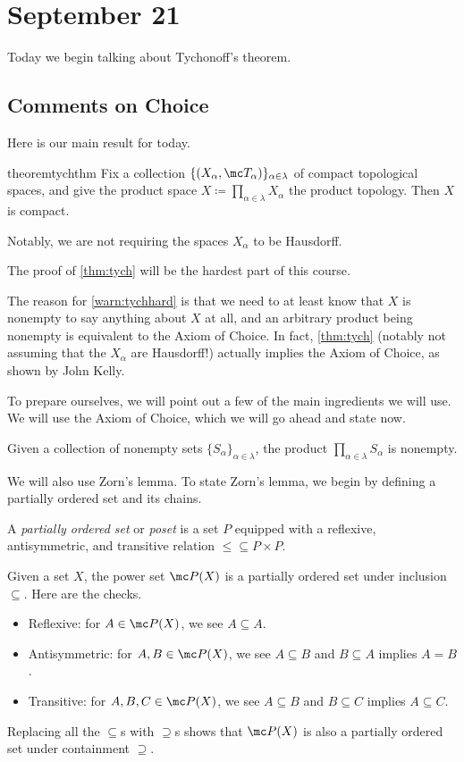 \documentclass[../notes.tex]{subfiles}
\begin{document}
\section{September 21}

Today we begin talking about Tychonoff's theorem.

\subsection{Comments on Choice}
Here is our main result for today.
\begin{restatable}[Tychonoff]{theorem}{tychthm} \label{thm:tych}
	Fix a collection $\{(X_\alpha,\mc T_\alpha)\}_{\alpha\in\lambda}$ of compact topological spaces, and give the product space $X\coloneqq\prod_{\alpha\in\lambda}X_\alpha$ the product topology. Then $X$ is compact.
\end{restatable}
\noindent Notably, we are not requiring the spaces $X_\alpha$ to be Hausdorff.
\begin{warn} \label{warn:tychhard}
	The proof of \autoref{thm:tych} will be the hardest part of this course.
\end{warn}
\begin{remark}
	The reason for \autoref{warn:tychhard} is that we need to at least know that $X$ is nonempty to say anything about $X$ at all, and an arbitrary product being nonempty is equivalent to the Axiom of Choice. In fact, \autoref{thm:tych} (notably not assuming that the $X_\alpha$ are Hausdorff!) actually implies the Axiom of Choice, as shown by John Kelly.
\end{remark}
To prepare ourselves, we will point out a few of the main ingredients we will use. We will use the Axiom of Choice, which we will go ahead and state now.
\begin{ax}[Choice]
	Given a collection of nonempty sets $\{S_\alpha\}_{\alpha\in\lambda}$, the product $\prod_{\alpha\in\lambda}S_\alpha$ is nonempty.
\end{ax}
We will also use Zorn's lemma. To state Zorn's lemma, we begin by defining a partially ordered set and its chains.
\begin{definition}[Poset]
	A \textit{partially ordered set} or \textit{poset} is a set $P$ equipped with a reflexive, antisymmetric, and transitive relation ${\le}\subseteq P\times P$.
\end{definition}
\begin{example} \label{ex:subsetsposet}
	Given a set $X$, the power set $\mc P(X)$ is a partially ordered set under inclusion $\subseteq$. Here are the checks.
	\begin{itemize}
		\item Reflexive: for $A\in\mc P(X)$, we see $A\subseteq A$.
		\item Antisymmetric: for $A,B\in\mc P(X)$, we see $A\subseteq B$ and $B\subseteq A$ implies $A=B$.
		\item Transitive: for $A,B,C\in\mc P(X)$, we see $A\subseteq B$ and $B\subseteq C$ implies $A\subseteq C$.
	\end{itemize}
	Replacing all the $\subseteq$s with $\supseteq$s shows that $\mc P(X)$ is also a partially ordered set under containment $\supseteq$.
\end{example}
\end{document}
